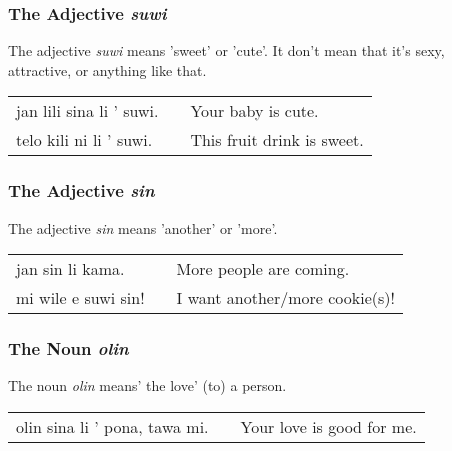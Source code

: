 %
\subsubsection*{The Adjective \textit{suwi}}
%

The adjective \textit{suwi} means 'sweet' or 'cute'.
It don't mean that it's sexy, attractive, or anything like that.

\begin{supertabular}{p{5,5cm}|ll}
    jan lili sina li ' suwi. &  & Your baby is cute.         \\
    telo kili ni li ' suwi.  &  & This fruit drink is sweet. \\
\end{supertabular}

%
\subsubsection*{The Adjective  \textit{sin}}
%
%
The adjective \textit{sin} means 'another' or 'more'.

\begin{supertabular}{p{5,5cm}|ll}
    jan sin li kama.    &  & More people are coming.        \\
    mi wile e suwi sin! &  & I want another/more cookie(s)! \\
\end{supertabular}

%
\subsubsection*{The Noun \textit{olin}}
%
%
The noun \textit{olin} means' the love' (to) a person.

\begin{supertabular}{p{5,5cm}|ll}
    olin sina li ' pona, tawa mi. &  & Your love is good for me. \\
\end{supertabular}

